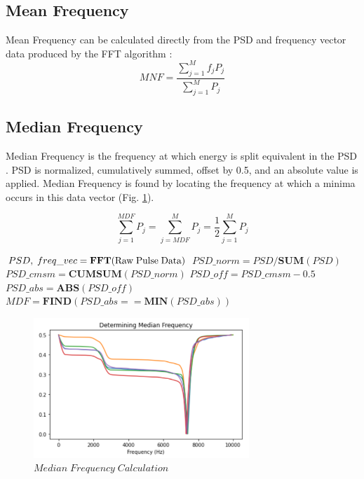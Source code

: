 \documentclass[conference]{IEEEtran}
\begin{document}
\subsection{Mean Frequency}
Mean Frequency can be calculated directly from the PSD and frequency vector data produced by the FFT algorithm \cite{angkoon2012}:
\begin{equation*}
    MNF = \frac{ \sum_{j=1}^M f_j P_j }{ \sum_{j=1}^M P_j }
\end{equation*}

\subsection{Median Frequency}
Median Frequency is the frequency at which energy is split equivalent in the PSD \cite{angkoon2012}. PSD is normalized, cumulatively summed, offset by 0.5, and an absolute value is applied.  Median Frequency is found by locating the frequency at which a minima occurs in this data vector (Fig. \ref{fig:MDF}).

\begin{equation*}
    \sum_{j=1}^{MDF} P_j = \sum_{j=MDF}^{M} P_j = \frac{1}{2} \sum_{j=1}^{M} P_j
\end{equation*}

\medbreak
\begin{algorithmic}
\STATE $PSD,\;freq\_vec = \textbf{FFT}(\text{Raw\;Pulse\;Data})$
\STATE $PSD\_norm = PSD / \textbf{SUM}(PSD)$
\STATE $PSD\_cmsm = \textbf{CUMSUM}(PSD\_norm)$
\STATE $PSD\_off = PSD\_cmsm - 0.5$
\STATE $PSD\_abs = \textbf{ABS}(PSD\_off)$
\STATE $MDF = \textbf{FIND}( PSD\_abs == \textbf{MIN}(PSD\_abs) )$
\end{algorithmic}

\begin{figure}[htb]
\centering
\includegraphics[width=3.2in]{figures/57_mdf.png}
\caption{$Median\;Frequency\;Calculation$}
\label{fig:MDF}
\end{figure}
\end{document}
